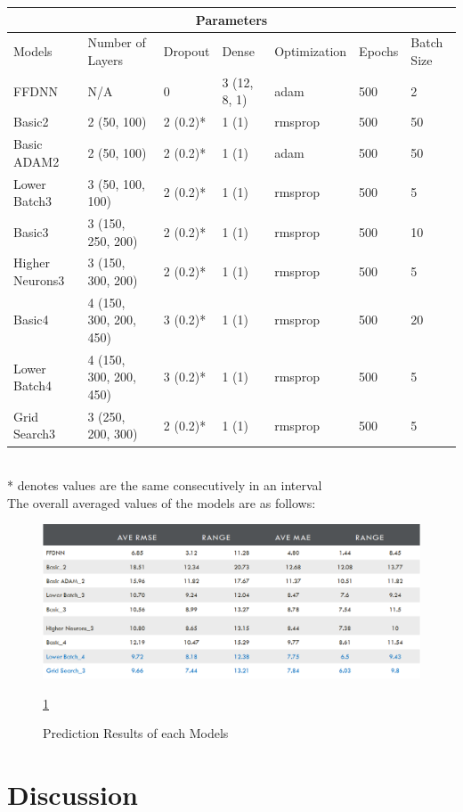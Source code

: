 \documentclass[10pt,11pt,12pt,oneside]{book}
\begin{document}
\begin{tabular}{ |p{2cm}||p{2.5cm}|p{1.5cm}|p{1.5cm}| p{2.5cm} | p{1.5cm}| p{1.5cm} |   }
 \hline
 \multicolumn{7}{|c|}{Parameters} \\
 \hline
Models & Number of Layers & Dropout & Dense & Optimization & Epochs & Batch Size\\
 \hline
 FFDNN & N/A & 0 & 3 (12, 8, 1) & adam & 500 & 2\\
 \hline
 Basic2 & 2 (50, 100) & 2 (0.2)* & 1 (1) & rmsprop & 500 & 50\\
 \hline
 Basic ADAM2 & 2 (50, 100) & 2 (0.2)* & 1 (1) & adam & 500 & 50\\
 \hline
 Lower Batch3 & 3 (50, 100, 100) & 2 (0.2)* & 1 (1) & rmsprop & 500 & 5\\
 \hline
 Basic3 & 3 (150, 250, 200) & 2 (0.2)* & 1 (1) & rmsprop & 500 & 10\\
 \hline
Higher Neurons3 & 3 (150, 300, 200) & 2 (0.2)* & 1 (1) & rmsprop & 500 & 5\\
 \hline
 Basic4 & 4 (150, 300, 200, 450) & 3 (0.2)* & 1 (1) & rmsprop & 500 & 20\\
 \hline
 Lower Batch4 & 4 (150, 300, 200, 450) & 3 (0.2)* & 1 (1) & rmsprop & 500 & 5\\
 \hline
 Grid Search3 & 3 (250, 200, 300) & 2 (0.2)* & 1 (1) & rmsprop & 500 & 5\\
 \hline


 \hline
\end{tabular}
    \\ * denotes values are the same consecutively in an interval\\
    The overall averaged values of the models are as follows:
    \begin{figure}
         \includegraphics[width=\linewidth]{results.png}
         \caption{Prediction Results of each Models}
         \label{fig:results}
         \ref{fig:results}
\end{figure}

\section{Discussion}
\end{document}
